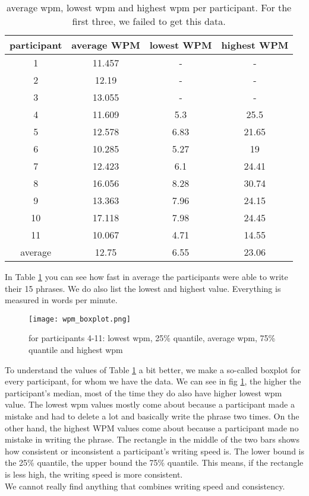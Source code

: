\begin{table}[ht!]
    \centering
    \begin{tabular}{cccc} \toprule
        participant&average WPM&lowest WPM&highest WPM\\ \midrule
        1 & 11.457 & - & -\\ 
        2 & 12.19 & - & -\\
        3 & 13.055 & - & -\\ 
        4 & 11.609 & 5.3 & 25.5\\
        5 & 12.578 & 6.83 & 21.65\\
        6 & 10.285 & 5.27 & 19\\
        7 & 12.423 & 6.1 & 24.41\\
        8 & 16.056 & 8.28 & 30.74\\
        9 & 13.363 & 7.96 & 24.15\\
        10 & 17.118 & 7.98 & 24.45\\
        11 & 10.067 & 4.71 & 14.55\\
        \bottomrule
        average&12.75&6.55&23.06\\
        \bottomrule
    \end{tabular}
    \caption{average wpm, lowest wpm and highest wpm per participant. For the first three, we failed to get this data.}
    \label{tab:WPM}
\end{table}

In Table \ref{tab:WPM} you can see how fast in average the participants were able to write their 15 phrases. We do also list the lowest and highest value. Everything is measured in words per minute.

\begin{figure}[H]
    \centering
    \texttt{[image: wpm\_boxplot.png]}
    \caption{for participants 4-11: lowest wpm, 25\% quantile, average wpm, 75\% quantile and highest wpm}
    \label{fig:WPM}
\end{figure}
To understand the values of Table \ref{tab:WPM} a bit better, we make a so-called boxplot for every participant, for whom we have the data. We can see in fig \ref{fig:WPM}, the higher the participant's median, most of the time they do also have higher lowest wpm value. The lowest wpm values mostly come about because a participant made a mistake and had to delete a lot and basically write the phrase two times. On the other hand, the highest WPM values come about because a participant made no mistake in writing the phrase. The rectangle in the middle of the two bars shows how consistent or inconsistent a participant's writing speed is. The lower bound is the 25\% quantile, the upper bound the 75\% quantile. This means, if the rectangle is less high, the writing speed is more consistent.\\
We cannot really find anything that combines writing speed and consistency.\\

